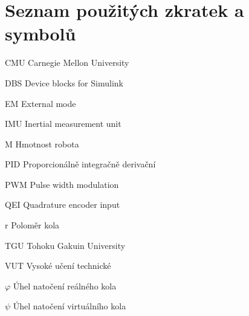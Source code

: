 \chapter{Seznam použitých zkratek a symbolů}
\symbolsize=3.5cm%
\vspace{7mm}
\begin{symboly}

\item[CMU] Carnegie Mellon University
\item[DBS] Device blocks for Simulink
\item[EM] External mode
\item[IMU] Inertial measurement unit
\item[M] Hmotnost robota
\item[PID] Proporcionálně integračně derivační
\item[PWM] Pulse width modulation
\item[QEI] Quadrature encoder input
\item[r] Poloměr kola
\item[TGU] Tohoku Gakuin University
\item[VUT] Vysoké učení technické
\item[$\varphi$] Úhel natočení reálného kola
\item[$\psi$] Úhel natočení virtuálního kola

\end{symboly}
